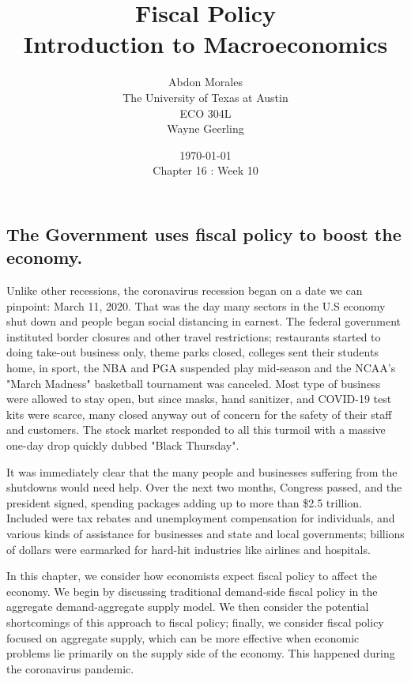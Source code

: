 \documentclass[11pt]{article} %
\title{Fiscal Policy \\ Introduction to Macroeconomics}
\author{Abdon Morales \\ The University of Texas at Austin \\ ECO 304L \\ Wayne Geerling}
\date{\today \\ Chapter 16 : Week 10}
\begin{document}
\maketitle
\subsection*{The Government uses fiscal policy to boost the economy.}
Unlike other recessions, the coronavirus recession began on a date we can pinpoint: March 11, 2020. That was the day many sectors in the U.S economy shut down and people began social distancing in earnest. The federal government instituted border closures and other travel restrictions; restaurants started to doing take-out business only, theme parks closed, colleges sent their students home, in sport, the NBA and PGA suspended play mid-season and the NCAA's "March Madness" basketball tournament was canceled. Most type of business were allowed to stay open, but since masks, hand sanitizer, and COVID-19 test kits were scarce, many closed anyway out of concern for the safety of their staff and customers. The stock market responded to all this turmoil with a massive one-day drop quickly dubbed "Black Thursday".

It was immediately clear that the many people and businesses suffering from the shutdowns would need help. Over the next two months, Congress passed, and the president signed, spending packages adding up to more than \$2.5 trillion. Included were tax rebates and unemployment compensation for individuals, and various kinds of assistance for businesses and state and local governments; billions of dollars were earmarked for hard-hit industries like airlines and hospitals.

In this chapter, we consider how economists expect fiscal policy to affect the economy. We begin by discussing traditional demand-side fiscal policy in the aggregate demand-aggregate supply model. We then consider the potential shortcomings of this approach to fiscal policy; finally, we consider fiscal policy focused on aggregate supply, which can be more effective when economic problems lie primarily on the supply side of the economy. This happened during the coronavirus pandemic.
\end{document}

